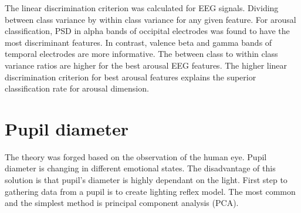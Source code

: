 \documentclass[10pt,journal,compsoc,twoside]{IEEEtran}
\begin{document}
\begin{table}[ht]
\centering
\caption{The performance of classifiers using different kinds of frequency band features. For \cite{SoleymaniPanticPun2002}.}
\label{table:performanceofclassifier2}
\end{table}
The linear discrimination criterion was calculated for EEG signals. Dividing between class variance by within class variance for any given feature.
For arousal classification, PSD in alpha bands of occipital electrodes was found to have the most discriminant features. In contrast, valence beta and gamma bands of temporal electrodes are more informative. The between class to within class variance ratios are higher for the best arousal EEG features. The higher linear discrimination criterion for best arousal features explains the superior classification rate for arousal dimension.



\section{Pupil diameter}
The theory was forged based on the observation of the human eye. Pupil diameter is changing in different emotional states. The disadvantage of this solution is that pupil's diameter is highly dependant on the light. First step to gathering data from a pupil is to create lighting reflex model. The most common and the simplest method is principal component analysis (PCA).
\end{document}
